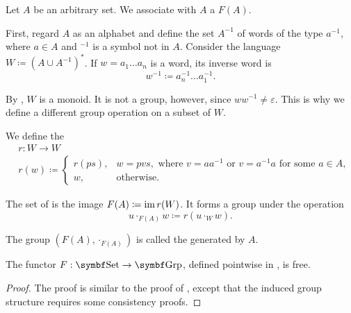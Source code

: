 \begin{definition}\label{def:free_group}\cite[306]{Knapp2016BAlg}
  Let \( A \) be an arbitrary set. We associate with \( A \) a  \( F(A) \). 

  First, regard \( A \) as an alphabet and define the set \( A^{-1} \) of words of the type \( a^{-1} \), where \( a \in A \) and \( \mbox{}^{-1} \) is a symbol not in \( A \). Consider the language \( W \coloneqq (A \cup A^{-1})^{*} \). If \( w = a_1 \ldots a_n \) is a word, its inverse word is
  \begin{equation*}
    w^{-1} \coloneqq a_n^{-1} \ldots a_1^{-1}.
  \end{equation*}

  By , \( W \) is a monoid. It is not a group, however, since \( w w^{-1} \neq \varepsilon \). This is why we define a different group operation on a subset of \( W \).

  We define the 
  \begin{align*}
    &r: W \to W \\
    &r(w) \coloneqq \begin{cases}
      r(ps), &w = pvs, \text{ where } v = aa^{-1} \text{ or } v = a^{-1}a \text{ for some } a \in A, \\
      w, &\text{otherwise}.
    \end{cases}
  \end{align*}

  The set of  is the image \( F(A) \coloneqq \operatorname{im} r(W) \). It forms a group under the operation
  \begin{equation*}
    u \cdot_{F(A)} w \coloneqq r(u \cdot_{W} w).
  \end{equation*}

  The group \( (F(A), \cdot_{F(A)}) \) is called the  generated by \( A \).
\end{definition}

\begin{proposition}\label{thm:free_group_is_free_functor}
  The functor \( F: \Cat{Set} \to \Cat{Grp} \), defined pointwise in , is free.
\end{proposition}
\begin{proof}
  The proof is similar to the proof of , except that the induced group structure requires some consistency proofs.
\end{proof}

